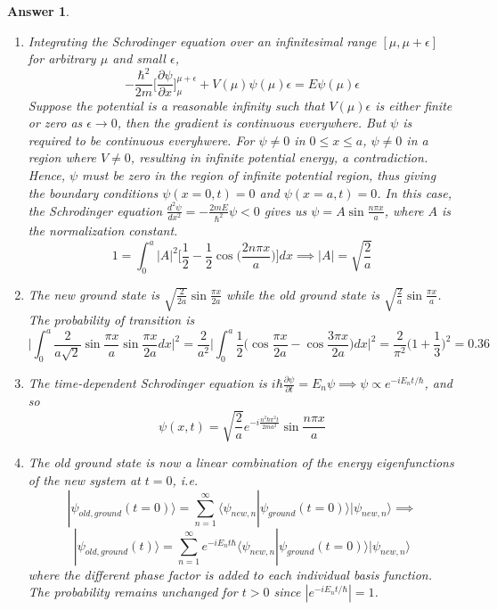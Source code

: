 \documentclass[a4paper]{article}
\newtheorem{ans}{Answer}[subsection]
\theoremstyle{new}
\begin{document}
\begin{ans}\leavevmode
\begin{enumerate}[label=(\roman*)]
\item Integrating the Schrodinger equation over an infinitesimal range $[\mu,\mu+\epsilon]$ for arbitrary $\mu$ and small $\epsilon$, 
$$-\frac{\hbar^2}{2m}\bigg[\frac{\partial\psi}{\partial x}\bigg]_\mu^{\mu+\epsilon}+V(\mu)\psi(\mu)\epsilon=E\psi(\mu)\epsilon$$
Suppose the potential is a reasonable infinity such that $V(\mu)\epsilon$ is either finite or zero as $\epsilon\rightarrow 0$, then the gradient is continuous everywhere. But $\psi$ is required to be continuous everyhwere. For $\psi\neq 0$ in $0\leq x\leq a$, $\psi\neq 0$ in a region where $V\neq 0$, resulting in infinite potential energy, a contradiction. Hence, $\psi$ must be zero in the region of infinite potential region, thus giving the boundary conditions $\psi(x=0,t)=0$ and $\psi(x=a,t)=0$. In this case, the Schrodinger equation $\frac{d^2\psi}{dx^2}=-\frac{2mE}{\hbar^2}\psi<0$ gives us $\psi=A\sin\frac{n\pi x}{a}$, where $A$ is the normalization constant.
$$1=\int_0^a|A|^2\bigg[\frac{1}{2}-\frac{1}{2}\cos\bigg(\frac{2n\pi x}{a}\bigg)\bigg]dx\implies |A|=\sqrt{\frac{2}{a}}$$
\item The new ground state is $\sqrt{\frac{2}{2a}}\sin\frac{\pi x}{2a}$ while the old ground state is $\sqrt{\frac{2}{a}}\sin\frac{\pi x}{a}$. The probability of transition is
$$\bigg|\int_0^a\frac{2}{a\sqrt{2}}\sin\frac{\pi x}{a}\sin\frac{\pi x}{2a}dx\bigg|^2=\frac{2}{a^2}\bigg|\int_0^a\frac{1}{2}\bigg(\cos\frac{\pi x}{2a}-\cos\frac{3\pi x}{2a}\bigg)dx\bigg|^2=\frac{2}{\pi^2}\bigg(1+\frac{1}{3}\bigg)^2=0.36$$
\item The time-dependent Schrodinger equation is $i\hbar\frac{\partial\psi}{\partial t}=E_n\psi\implies\psi\propto e^{-iE_nt/\hbar}$, and so
$$\psi(x,t)=\sqrt{\frac{2}{a}}e^{-i\frac{n^2\hbar\pi^2t}{2ma^2}}\sin\frac{n\pi x}{a}$$
\item The old ground state is now a linear combination of the energy eigenfunctions of the new system at $t=0$, i.e.
$$|\psi_{old,ground}(t=0)\rangle=\sum_{n=1}^\infty\langle\psi_{new,n}|\psi_{ground}(t=0)\rangle|\psi_{new,n}\rangle\implies$$
$$|\psi_{old,ground}(t)\rangle=\sum_{n=1}^\infty e^{-iE_nt\hbar}\langle\psi_{new,n}|\psi_{ground}(t=0)\rangle|\psi_{new,n}\rangle$$
where the different phase factor is added to each individual basis function. The probability remains unchanged for $t>0$ since $|e^{-iE_nt/\hbar}|=1$.
\end{enumerate}
\end{ans}
\end{document}
